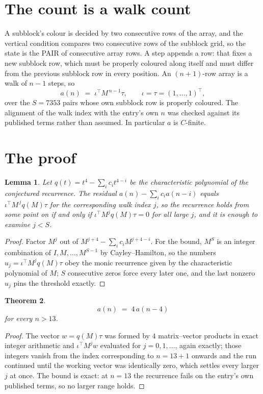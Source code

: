 \documentclass[11pt,a4paper]{article}
\theoremstyle{plain}
\newtheorem{theorem}{Theorem}
\newtheorem{lemma}[theorem]{Lemma}
\theoremstyle{definition}
\begin{document}
\section{The count is a walk count}

A subblock's colour is decided by two consecutive rows of the array, and
the vertical condition compares two consecutive rows of the subblock grid, so the state is the
PAIR of consecutive array rows. A step appends a row: that fixes a new subblock row, which
must be properly coloured along itself and must differ from the previous subblock row in every
position. An $(n+1)$-row array is a walk of $n-1$ steps, so
\[
a(n)\;=\;\iota^{\!\top}M^{\,n-1}\tau,\qquad\iota=\tau=(1,\dots,1)^{\!\top},
\]
over the $S=7353$ pairs whose own subblock row is properly coloured.
The alignment of the walk index with the entry's own $n$ was checked against its published
terms rather than assumed. In particular $a$ is $C$-finite.

\section{The proof}

\begin{lemma}\label{lem:crit}
Let $q(t)=t^{4}-\sum_i c_it^{4-i}$ be the characteristic polynomial of the
conjectured recurrence. The residual $a(n)-\sum_ic_ia(n-i)$ equals
$\iota^{\!\top}M^{\,j}q(M)\tau$ for the corresponding walk index $j$, so the recurrence
holds from some point on if and only if $\iota^{\!\top}M^{j}q(M)\tau=0$ for all large $j$,
and it is enough to examine $j<S$.
\end{lemma}

\begin{proof}
Factor $M^{j}$ out of $M^{j+4}-\sum_ic_iM^{j+4-i}$. For the bound, $M^{S}$
is an integer combination of $I,M,\dots,M^{S-1}$ by Cayley--Hamilton, so the numbers
$u_j=\iota^{\!\top}M^{j}q(M)\tau$ obey the monic recurrence given by the characteristic
polynomial of $M$; $S$ consecutive zeros force every later one, and the last nonzero $u_j$
pins the threshold exactly.
\end{proof}

\begin{theorem}
\[
a(n)\;=\;4\,a(n-4)
\]
for every $n>13$.
\end{theorem}

\begin{proof}
The vector $w=q(M)\tau$ was formed by $4$ matrix--vector products in exact integer
arithmetic and $\iota^{\!\top}M^{j}w$ evaluated for $j=0,1,\dots$, again exactly; those
integers vanish from the index corresponding to $n=13+1$ onwards and the run continued
until the working vector was identically zero, which settles every larger $j$ at once. The bound is exact: at $n=13$ the recurrence fails on the entry's own published terms, so no larger range holds.
\end{proof}
\end{document}
